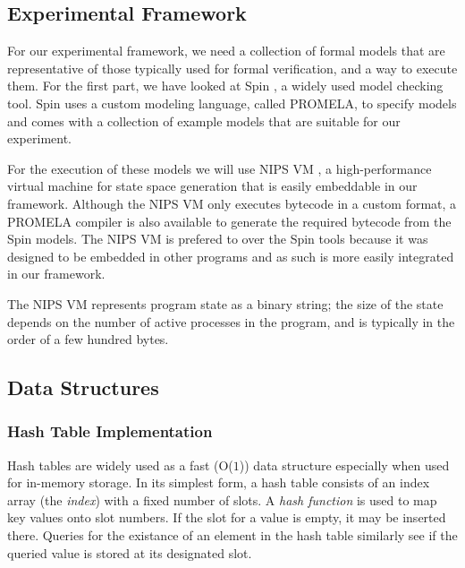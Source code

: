 \documentclass{acm_proc_article-sp}
\begin{document}
\subsection{Experimental Framework}


For our experimental framework, we need a collection of formal models that are
representative of those typically used for formal verification, and a way to
execute them. For the first part, we have looked at Spin \cite{spin}, a widely
used model checking tool. Spin uses a custom modeling language, called
PROMELA, to specify models and comes with a collection of example models that
are suitable for our experiment.

For the execution of these models we will use NIPS VM \cite{weber2007evm}, a
high-performance virtual machine for state space generation that is easily
embeddable in our framework. Although the NIPS VM only executes bytecode in a
custom format, a PROMELA compiler is also available to generate the required
bytecode from the Spin models.\cite{nips} The NIPS VM is prefered to over the
Spin tools because it was designed to be embedded in other programs and as
such is more easily integrated in our framework.

The NIPS VM represents program state as a binary string; the size of the state
depends on the number of active processes in the program, and is typically in
the order of a few hundred bytes.

\subsection{Data Structures}

\subsubsection{Hash Table Implementation}
Hash tables are widely used as a fast (O($1$)) data structure especially when
used for in-memory storage. In its simplest form, a hash table consists of an
index array (the \emph{index}) with a fixed number of slots. A \emph{hash
function} is used to map key values onto slot numbers. If the slot for a value
is empty, it may be inserted there. Queries for the existance of an element in
the hash table similarly see if the queried value is stored at its designated
slot.
\end{document}

